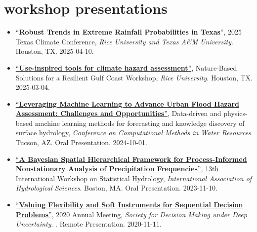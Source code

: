 \documentclass[10pt,oneside]{article}
\begin{document}
\mbox{}\vspace{-\dimexpr\baselineskip\relax}
\vspace*{-1em}
\printbibliography[type=inproceedings, heading=none]


\section{workshop presentations}

\mbox{}\vspace{-\dimexpr\baselineskip\relax}

\begin{itemize}[label={}]

  \item \enquote{\textbf{Robust Trends in Extreme Rainfall Probabilities in Texas}}, 2025 Texas Climate Conference,  \textit{Rice University and Texas A\&M University}. Houston, TX. 2025-04-10.

  \item \href{https://events.rice.edu/event/nbs-workshop#!view/all}{\enquote{\textbf{Use-inspired tools for climate hazard assessment}}}, Nature-Based Solutions for a Resilient Gulf Coast Workshop,  \textit{Rice University}. Houston, TX. 2025-03-04.

  \item \href{https://cmwrconference.org/wp-content/uploads/2024/09/CMWR-2024-Agenda-Full.pdf}{\enquote{\textbf{Leveraging Machine Learning to Advance Urban Flood Hazard Assessment: Challenges and Opportunities}}}, Data-driven and physics-based machine learning methods for forecasting and knowledge discovery of surface hydrology,  \textit{Conference on Computational Methods in Water Resources}. Tucson, AZ. Oral Presentation. 2024-10-01.

  \item \href{https://iahs.info/uploads/Commissions/ICSH/STAHY%202023%20Program%20Public.pdf}{\enquote{\textbf{A Bayesian Spatial Hierarchical Framework for Process-Informed Nonstationary Analysis of Precipitation Frequencies}}}, 13th International Workshop on Statistical Hydrology,  \textit{International Association of Hydrological Sciences}. Boston, MA. Oral Presentation. 2023-11-10.

  \item \href{https://2020.deepuncertainty.org/program}{\enquote{\textbf{Valuing Flexibility and Soft Instruments for Sequential Decision Problems}}}, 2020 Annual Meeting,  \textit{Society for Decision Making under Deep Uncertainty}. . Remote Presentation. 2020-11-11.


\end{itemize}
\end{document}
